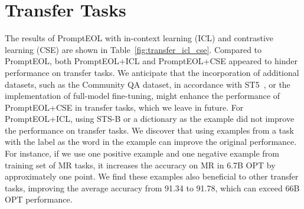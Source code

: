 \documentclass{article}
\begin{document}
\section{Transfer Tasks}\label{apx:transfer_task}
The results of PromptEOL with in-context learning (ICL) and contrastive learning (CSE) are shown in Table~\ref{fig:transfer_icl_cse}. Compared to PromptEOL, both PromptEOL+ICL and PromptEOL+CSE appeared to hinder performance on transfer tasks. We anticipate that the incorporation of additional datasets, such as the Community QA dataset, in accordance with ST5~\cite{sentencet5}, or the implementation of full-model fine-tuning, might enhance the performance of PromptEOL+CSE in transfer tasks, which we leave in future.
For PromptEOL+ICL, using STS-B or a dictionary as the example did not improve the performance on transfer tasks.
We discover that using examples from a task with the label as the word in the example can improve the original performance.
For instance, if we use one positive example and one negative example from training set of MR tasks, it increases the accuracy on MR in 6.7B OPT by approximately one point.
We find these examples also beneficial to other transfer tasks, improving the average accuracy from 91.34 to 91.78, which can exceed 66B OPT performance.
\end{document}
